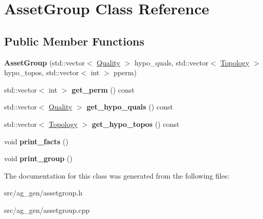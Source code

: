 \hypertarget{class_asset_group}{}\section{Asset\+Group Class Reference}
\label{class_asset_group}
\subsection*{Public Member Functions}
\begin{DoxyCompactItemize}
\item 
\mbox{\label{class_asset_group_a65936c858735a3addd31645a23507281}} 
{\bfseries Asset\+Group} (std\+::vector$<$ \mbox{\hyperlink{class_quality}{Quality}} $>$ hypo\+\_\+quals, std\+::vector$<$ \mbox{\hyperlink{class_topology}{Topology}} $>$ hypo\+\_\+topos, std\+::vector$<$ int $>$ pperm)
\item 
\mbox{\label{class_asset_group_a9cc88c1017e56949c8745feda8a1fff9}} 
std\+::vector$<$ int $>$ {\bfseries get\+\_\+perm} () const
\item 
\mbox{\label{class_asset_group_a1bbe8cfd576153fa260912ecd3d87350}} 
std\+::vector$<$ \mbox{\hyperlink{class_quality}{Quality}} $>$ {\bfseries get\+\_\+hypo\+\_\+quals} () const
\item 
\mbox{\label{class_asset_group_afbcd1d749c5e87290e48b34b3da8b8ba}} 
std\+::vector$<$ \mbox{\hyperlink{class_topology}{Topology}} $>$ {\bfseries get\+\_\+hypo\+\_\+topos} () const
\item 
\mbox{\label{class_asset_group_a8a583644f47734240cd3d0d30240a5e1}} 
void {\bfseries print\+\_\+facts} ()
\item 
\mbox{\label{class_asset_group_a00b4fba96d51e69a7f253e2e712c0555}} 
void {\bfseries print\+\_\+group} ()
\end{DoxyCompactItemize}


The documentation for this class was generated from the following files\+:\begin{DoxyCompactItemize}
\item 
src/ag\+\_\+gen/assetgroup.\+h\item 
src/ag\+\_\+gen/assetgroup.\+cpp\end{DoxyCompactItemize}
